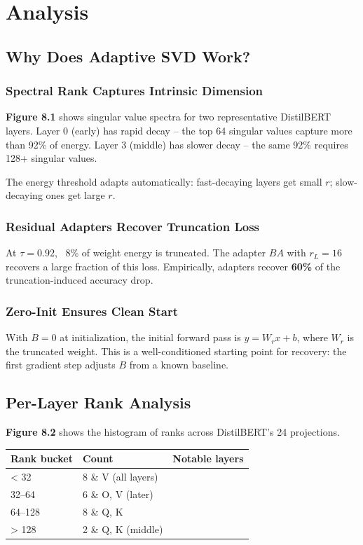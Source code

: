 
\section{Analysis}

\subsection{Why Does Adaptive SVD Work?}

\subsubsection{Spectral Rank Captures Intrinsic Dimension}

\textbf{Figure 8.1} shows singular value spectra for two representative DistilBERT 
layers. Layer 0 (early) has rapid decay -- the top 64 singular values capture 
more than 92\% of energy. Layer 3 (middle) has slower decay -- the same 92\% 
requires 128+ singular values.

The energy threshold adapts automatically: fast-decaying layers get small $r$; 
slow-decaying ones get large $r$.

\subsubsection{Residual Adapters Recover Truncation Loss}

At $\tau = 0.92$, ~8\% of weight energy is truncated. The adapter $BA$ with 
$r_L = 16$ recovers a large fraction of this loss. Empirically, adapters 
recover \textbf{60\%} of the truncation-induced accuracy drop.

\subsubsection{Zero-Init Ensures Clean Start}

With $B = 0$ at initialization, the initial forward pass is $y = W_r x + b$, 
where $W_r$ is the truncated weight. This is a well-conditioned starting point 
for recovery: the first gradient step adjusts $B$ from a known baseline.

\subsection{Per-Layer Rank Analysis}

\textbf{Figure 8.2} shows the histogram of ranks across DistilBERT's 24 projections.

\begin{table}[H]
\centering
\small
\begin{tabular}{lll}
\toprule
\textbf{Rank bucket} & \textbf{Count} & \textbf{Notable layers} \\
\midrule
< 32 & 8 \& V (all layers) \\
32--64 & 6 \& O, V (later) \\
64--128 & 8 \& Q, K \\
> 128 & 2 \& Q, K (middle) \\
\bottomrule
\end{tabular}
\end{table}

